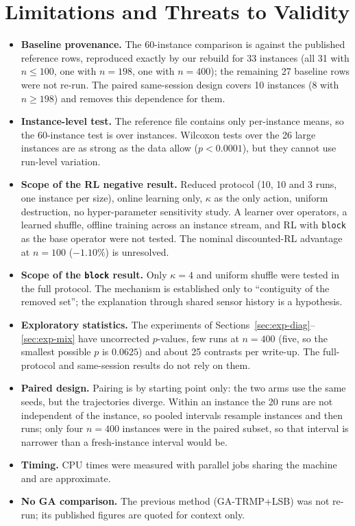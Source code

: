 
\section{Limitations and Threats to Validity}\label{sec:discussion-limits}

\begin{itemize}
\item \textbf{Baseline provenance.} The 60-instance comparison is against the published reference rows, reproduced exactly by our rebuild for 33 instances (all 31 with $n\le100$, one with $n=198$, one with $n=400$); the remaining 27 baseline rows were not re-run. The paired same-session design covers 10 instances (8 with $n\ge198$) and removes this dependence for them.
\item \textbf{Instance-level test.} The reference file contains only per-instance means, so the 60-instance test is over instances. Wilcoxon tests over the 26 large instances are as strong as the data allow ($p<0.0001$), but they cannot use run-level variation.
\item \textbf{Scope of the RL negative result.} Reduced protocol (10, 10 and 3 runs, one instance per size), online learning only, $\kappa$ as the only action, uniform destruction, no hyper-parameter sensitivity study. A learner over operators, a learned shuffle, offline training across an instance stream, and RL with \texttt{block} as the base operator were not tested. The nominal discounted-RL advantage at $n=100$ ($-1.10\%$) is unresolved.
\item \textbf{Scope of the \texttt{block} result.} Only $\kappa=4$ and uniform shuffle were tested in the full protocol. The mechanism is established only to \enquote{contiguity of the removed set}; the explanation through shared sensor history is a hypothesis.
\item \textbf{Exploratory statistics.} The experiments of Sections~\ref{sec:exp-diag}--\ref{sec:exp-mix} have uncorrected $p$-values, few runs at $n=400$ (five, so the smallest possible $p$ is $0.0625$) and about 25 contrasts per write-up. The full-protocol and same-session results do not rely on them.
\item \textbf{Paired design.} Pairing is by starting point only: the two arms use the same seeds, but the trajectories diverge. Within an instance the 20 runs are not independent of the instance, so pooled intervals resample instances and then runs; only four $n=400$ instances were in the paired subset, so that interval is narrower than a fresh-instance interval would be.
\item \textbf{Timing.} CPU times were measured with parallel jobs sharing the machine and are approximate.
\item \textbf{No GA comparison.} The previous method (GA-TRMP+LSB) was not re-run; its published figures are quoted for context only.
\end{itemize}


